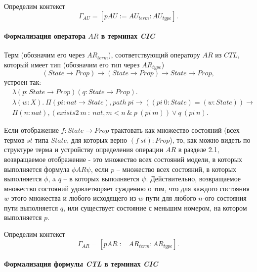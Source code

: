\documentclass[12pt]{article}
\begin{document}
Определим контекст $$\Gamma_{AU} = [pAU:=AU_{term}:AU_{type}].$$

\paragraph{Формализация оператора $AR$ в терминах \textit{CIC}}\mbox{}

Терм (обозначим его через $AR_{term}$), соответствующий оператору $AR$ из $CTL$, который имеет тип (обозначим его тип через $AR_{type}$) 
$$(State \xrightarrow{} Prop) \xrightarrow{} (State \xrightarrow{} Prop) \xrightarrow{} State \xrightarrow{} Prop,$$
устроен так:
\begin{align*}
& \lambda(p : State \xrightarrow{} Prop)(q : State \xrightarrow{} Prop).\\ 
& \lambda (w : X).\ \Pi (pi : nat \xrightarrow{} State), path\ pi \xrightarrow{} ((pi\ 0:State) = (w:State)) \xrightarrow{} \\
& \Pi (n : nat),(exists2\ m\ :\ nat, m < n\ \& \ p\ (pi\ m)) \lor q\ (pi\ n).
\end{align*}

Если отображение $f : State \xrightarrow{} Prop$ трактовать как множество состояний (всех термов $st$ типа $State$, для которых верно $(f\ st) : Prop$), то, как можно видеть по структуре терма и устройству определения операции $AR$ в разделе 2.1, возвращаемое отображение - это множество всех состояний модели, в которых выполняется формула $\phi AR \psi$, если $p$ -- множество всех состояний, в которых выполняется $\phi$, a $q$ -- в которых выполняется $\psi$.
Действительно, возвращаемое множество состояний удовлетворяет суждению о том, что для каждого состояния $w$ этого множества и любого исходящего из $w$ пути для любого $n$-ого состояния пути выполняется $q$, или существует состояние с меньшим номером, на котором выполняется $p$.

Определим контекст $$\Gamma_{AR} = [pAR:=AR_{term}:AR_{type}].$$

\paragraph{Формализация формулы \textit{CTL} в терминах \textit{CIC}}\mbox{} \\
\end{document}
